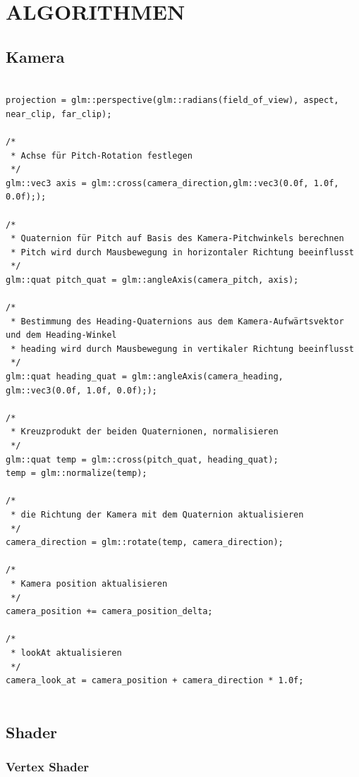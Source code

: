 	\newpage
	\section{\Large ALGORITHMEN}
	
	\subsection{Kamera}
	
	
\begin{lstlisting}

projection = glm::perspective(glm::radians(field_of_view), aspect, near_clip, far_clip);

/*
 * Achse für Pitch-Rotation festlegen
 */
glm::vec3 axis = glm::cross(camera_direction,glm::vec3(0.0f, 1.0f, 0.0f););

/*
 * Quaternion für Pitch auf Basis des Kamera-Pitchwinkels berechnen
 * Pitch wird durch Mausbewegung in horizontaler Richtung beeinflusst
 */
glm::quat pitch_quat = glm::angleAxis(camera_pitch, axis);

/*
 * Bestimmung des Heading-Quaternions aus dem Kamera-Aufwärtsvektor und dem Heading-Winkel
 * heading wird durch Mausbewegung in vertikaler Richtung beeinflusst
 */
glm::quat heading_quat = glm::angleAxis(camera_heading, glm::vec3(0.0f, 1.0f, 0.0f););

/*
 * Kreuzprodukt der beiden Quaternionen, normalisieren
 */
glm::quat temp = glm::cross(pitch_quat, heading_quat);
temp = glm::normalize(temp);

/*
 * die Richtung der Kamera mit dem Quaternion aktualisieren
 */
camera_direction = glm::rotate(temp, camera_direction);

/*
 * Kamera position aktualisieren
 */
camera_position += camera_position_delta;

/*
 * lookAt aktualisieren
 */
camera_look_at = camera_position + camera_direction * 1.0f;


\end{lstlisting}
	
	\subsection{Shader}
	
	\subsubsection{Vertex Shader}
	

